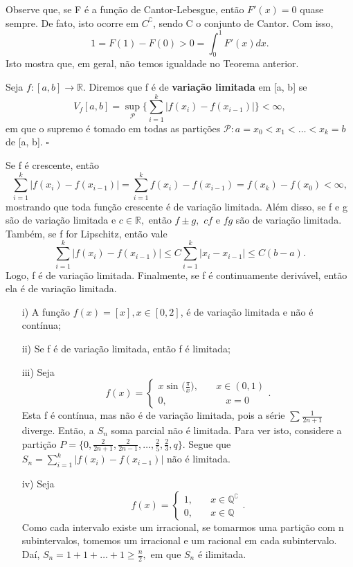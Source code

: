 \documentclass[measure_theory.tex]{subfiles}
\begin{document}
Observe que, se F é a função de Cantor-Lebesgue, então \(F'(x) = 0\) quase sempre. De fato, isto ocorre em \(C ^{\complement}\), sendo C o conjunto de Cantor. Com isso,
\[
	1 = F(1) - F(0) > 0 = \int_{0}^{1}F'(x)dx.
\]
Isto mostra que, em geral, não temos igualdade no Teorema anterior.
\begin{def*}
	Seja \(f:[a, b]\rightarrow \mathbb{R}\). Diremos que f é de \textbf{variação limitada} em [a, b] se
	\[
		V_f[a, b] = \sup_{\mathcal{P}}\biggl\{\sum\limits_{i=1}^{k}|f(x_{i}) - f(x_{i-1})|\biggr\} < \infty,
	\]
	em que o supremo é tomado em todas as partições \(\mathcal{P}: a = x_{0} < x_1 < \dotsc <x_{k} = b\) de [a, b]. \(\square\)
\end{def*}
Se f é crescente, então
\[
	\sum\limits_{i=1}^{k} |f(x_{i}) - f(x_{i-1})| = \sum\limits_{i=1}^{k}f(x_{i}) - f(x_{i-1}) = f(x_{k}) - f(x_{0}) < \infty,
\]
mostrando que toda função crescente é de variação limitada. Além disso, se f e g são de variação limitada e \(c\in \mathbb{R},\) então \(f\pm g,\) \(cf\) e \(fg\) são de variação limitada. Também, se f for Lipschitz, então vale
\[
	\sum\limits_{i=1}^{k}|f(x_{i}) - f(x_{i-1})| \leq C \sum\limits_{i=1}^{k}|x_{i}-x_{i-1}| \leq C(b-a).
\]
Logo, f é de variação limitada. Finalmente, se f é continuamente derivável, então ela é de variação limitada.
\begin{example}
	\begin{itemize}
		\item[i)] A função \(f(x) = [x], x\in [0, 2]\), é de variação limitada e não é contínua;
		\item[ii)] Se f é de variação limitada, então f é limitada;
		\item[iii)] Seja
		      \[
			      f(x) = \left\{\begin{array}{ll}
				      x\sin^{}{\biggl(\frac{\pi }{x}\biggr)},\quad & x\in (0 ,1) \\
				      0,                                           & \quad x = 0
			      \end{array}\right..
		      \]
		      Esta f é contínua, mas não é de variação limitada, pois a série \(\sum\limits_{}^{}\frac{1}{2n+1}\) diverge. Então, a \(S_{n}\) soma parcial não é limitada. Para ver isto, considere a partição \(P = \biggl\{0, \frac{2}{2n+1}, \frac{2}{2n-1}, \dotsc , \frac{2}{5}, \frac{2}{3}, q\biggr\}.\) Segue que \(S_{n} = \sum\limits_{i=1}^{k}|f(x_{i}) - f(x_{i-1})|\) não
		      é limitada.
		\item[iv)] Seja
		      \[
			      f(x) = \left\{\begin{array}{ll}
				      1, & \quad x\in \mathbb{Q}^{\complement} \\
				      0, & \quad x\in \mathbb{Q}
			      \end{array}\right..
		      \]
		      Como cada intervalo existe um irracional, se tomarmos uma partição com n subintervalos, tomemos um irracional e um racional em cada subintervalo. Daí, \(S_{n} = 1 + 1 +\dotsc +1\geq \frac{n}{2},\) em que \(S_{n}\) é ilimitada.
	\end{itemize}
\end{example}
\end{document}
